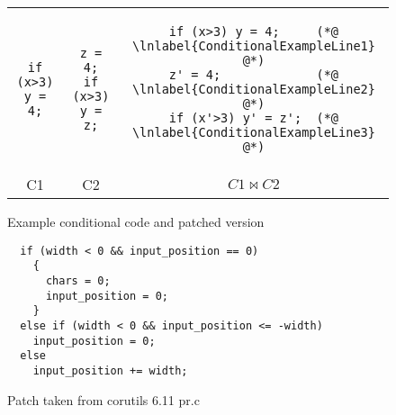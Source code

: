\begin{figure}
\centering
\begin{tabular}{ccc}
\begin{lstlisting}
if (x>3) y = 4;
\end{lstlisting}
&
\begin{lstlisting}
z = 4;
if (x>3) y = z;
\end{lstlisting}
&
\begin{lstlisting}
if (x>3) y = 4;     (*@ \lnlabel{ConditionalExampleLine1} @*)
z' = 4;             (*@ \lnlabel{ConditionalExampleLine2} @*)
if (x'>3) y' = z';  (*@ \lnlabel{ConditionalExampleLine3} @*)
\end{lstlisting}
\\
\small{C1} & \small{C2} & \small{$C1 \bowtie C2$}
\end{tabular}
\caption{Example conditional code and patched version}
\end{figure}

\begin{figure}
\centering
\begin{lstlisting}
  if (width < 0 && input_position == 0)
    {
      chars = 0;
      input_position = 0;
    }
  else if (width < 0 && input_position <= -width)
    input_position = 0;
  else
    input_position += width;
\end{lstlisting}
\caption{Patch taken from corutils 6.11 pr.c}
\end{figure}

